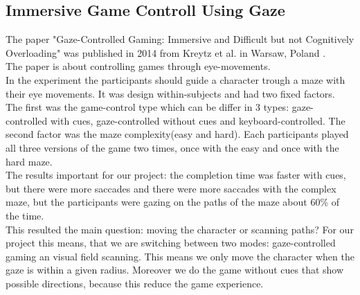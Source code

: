 \documentclass{sigchi}
\begin{document}
\subsection{Immersive Game Controll Using Gaze}
The paper "Gaze-Controlled Gaming: Immersive and Difficult but not Cognitively Overloading" was published in 2014 from Kreytz et al. in Warsaw, Poland \cite{krejtz2014gaze}.\\
The paper is about controlling games through eye-movements.\\
In the experiment the participants should guide a character trough a maze with their eye movements. It was design within-subjects and had two fixed factors. The first was the game-control type which can be differ in 3 types: gaze-controlled with cues, gaze-controlled without cues and keyboard-controlled. The second factor was the maze complexity(easy and hard). Each participants played all three versions of the game two times, once with the easy and once with the hard maze.\\
The results important for our project: the completion time was faster with cues, but there were more saccades and there were more saccades with the complex maze, but the participants were gazing on the paths of the maze about 60\% of the time.\\
This resulted the main question: moving the character or scanning paths? For our project this means, that we are switching between two modes: gaze-controlled gaming an visual field scanning. This means we only move the character when the gaze is within a given radius. Moreover we do the game without cues that show possible directions, because this reduce the game experience. 
\end{document}
